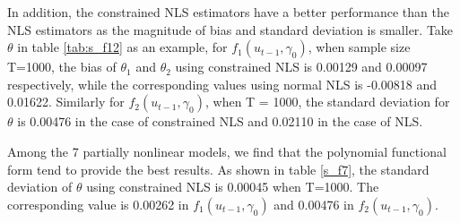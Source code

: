 \documentclass[a4paper,12pt,times,numbered,print,index]{report}
\numberwithin{equation}{section}
\begin{document}
	In addition, the constrained NLS estimators have a better performance than the NLS estimators as the magnitude of bias and standard deviation is smaller. 
	Take $\theta$ in table \ref{tab:s_f12} as an example, for $f_1(u_{t-1}, \gamma_0)$, when sample size T=1000, the bias of $\theta_1$ and $\theta_2$ using constrained NLS is 0.00129 and 0.00097 respectively, while the corresponding values using normal NLS is -0.00818 and 0.01622. Similarly for $f_2(u_{t-1}, \gamma_0)$, when T = 1000, the standard deviation for $\theta$ is 0.00476 in the case of constrained NLS and 0.02110 in the case of NLS.  
	
	Among the 7 partially nonlinear models, we find that the polynomial functional form tend to provide the best results. As shown in table \ref{s_f7}, the standard deviation of $\theta$ using constrained NLS is 0.00045 when T=1000. The corresponding value is 0.00262 in $f_1(u_{t-1}, \gamma_0)$ and 0.00476 in $f_2(u_{t-1}, \gamma_0)$.
	
\end{document}
